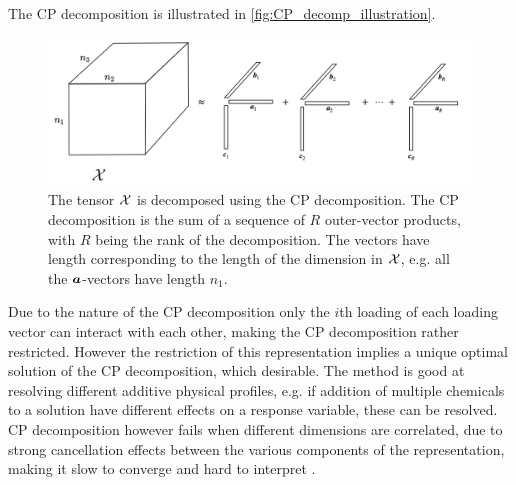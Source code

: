 The CP decomposition is illustrated in \autoref{fig:CP_decomp_illustration}.
\begin{figure}
    \centering
    \captionsetup{width=.95\linewidth}
    \includegraphics[width=\linewidth]{Pics/02_Theory/CP_decomp_illustration.png}
    \caption{The tensor $\mathcal{X}$ is decomposed using the CP decomposition. The CP decomposition is the sum of a sequence of $R$ outer-vector products, with $R$ being the rank of the decomposition. The vectors have length corresponding to the length of the dimension in $\mathcal{X}$, e.g. all the $\boldsymbol{a}$-vectors have length $n_1$.}
    \label{fig:CP_decomp_illustration}
\end{figure}

Due to the nature of the CP decomposition only the $i$th loading of each loading vector can interact with each other, making the CP decomposition rather restricted. However the restriction of this representation implies a unique optimal solution of the CP decomposition, which desirable. The method is good at resolving different additive physical profiles, e.g. if addition of multiple chemicals to a solution have different effects on a response variable, these can be resolved. CP decomposition however fails when different dimensions are correlated, due to strong cancellation effects between the various components of the representation, making it slow to converge and hard to interpret \cite{Mørup2011}.

